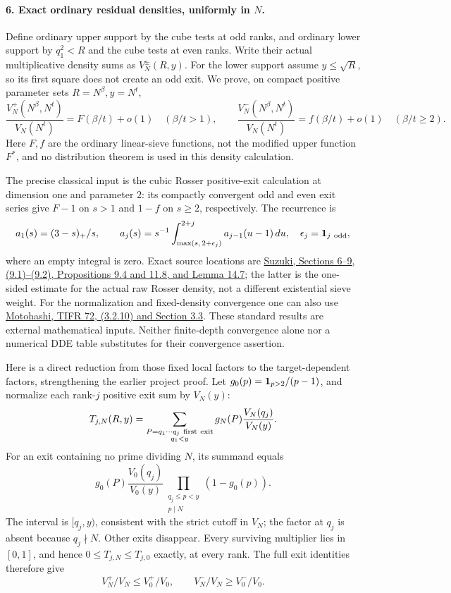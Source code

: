 \paragraph{6. Exact ordinary residual densities, uniformly in \(N\).}
Define ordinary upper support by the cube tests at odd ranks, and
ordinary lower support by \(q_1^2<R\) and the cube tests at even
ranks. Write their actual multiplicative density sums as \(V_N^\pm(R,y)\).
For the lower support assume \(y\le\sqrt R\), so its first square
does not create an odd exit. We prove, on compact positive parameter
sets \(R=N^\beta,y=N^t\),
\begin{equation}\label{eq:own-lower-ordinary-equalities}
 \frac{V_N^+(N^\beta,N^t)}{V_N(N^t)}=F(\beta/t)+o(1)
       \quad(\beta/t>1),\qquad
 \frac{V_N^-(N^\beta,N^t)}{V_N(N^t)}=f(\beta/t)+o(1)
       \quad(\beta/t\ge2).
\end{equation}
Here \(F,f\) are the ordinary linear-sieve functions, not the modified
upper function \(F^*\), and no distribution theorem is used in this
density calculation.

The precise classical input is the cubic Rosser positive-exit
calculation at dimension one and parameter \(2\): its compactly
convergent odd and even exit series give \(F-1\) on \(s>1\) and
\(1-f\) on \(s\ge2\), respectively. The recurrence is
\[
 a_1(s)=(3-s)_+/s,\qquad
 a_j(s)=s^{-1}\int_{\max(s,\,2+\epsilon_j)}^{2+j}a_{j-1}(u-1)\,du,
 \quad \epsilon_j={\bf1}_{j\ {\rm odd}},
\]
where an empty integral is zero.
Exact source locations are
\href{https://www.suzuyu1729.com/notes/NagoyaSeminar2022/RosserIwaniec.pdf}
{Suzuki, Sections 6--9, (9.1)--(9.2), Propositions 9.4 and 11.8,
and Lemma 14.7}; the latter is the one-sided estimate for the
actual raw Rosser density, not a different existential sieve weight.
For the normalization and fixed-density convergence one can also use
\href{https://mathweb.tifr.res.in/Documents/Publications/Lectures/tifr72.pdf}
{Motohashi, TIFR 72, (3.2.10) and Section 3.3}.
These standard results are external mathematical inputs. Neither
finite-depth convergence alone nor a numerical DDE table substitutes
for their convergence assertion.

Here is a direct reduction from those fixed local factors to the
target-dependent factors, strengthening the earlier project proof.
Let \(g_0(p)={\bf1}_{p>2}/(p-1)\), and normalize each rank-\(j\)
positive exit sum by \(V_N(y)\):
\[
 T_{j,N}(R,y)=\sum_{\substack{P=q_1\cdots q_j\ {\rm first\ exit}\\q_1<y}}
 g_N(P)\frac{V_N(q_j)}{V_N(y)}.
\]
For an exit containing no prime dividing \(N\), its summand equals
\begin{equation}\label{eq:own-lower-exit-deletion}
 g_0(P)\frac{V_0(q_j)}{V_0(y)}
 \prod_{\substack{q_j\le p<y\\p\mid N}}(1-g_0(p)).
\end{equation}
The interval is \([q_j,y)\), consistent with the strict cutoff in
\(V_N\); the factor at \(q_j\) is absent because \(q_j\nmid N\).
Other exits disappear. Every surviving multiplier lies in \([0,1]\),
and hence \(0\le T_{j,N}\le T_{j,0}\) exactly, at every rank.
The full exit identities therefore give
\[
 V_N^+/V_N\le V_0^+/V_0,\qquad V_N^-/V_N\ge V_0^-/V_0.
\]

